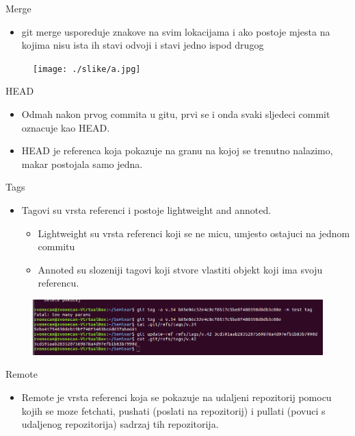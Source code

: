\documentclass[]{beamer}
\begin{document}
\begin{frame}{Merge}
\begin{itemize}
	\item git merge usporeduje znakove na svim lokacijama i ako postoje mjesta na kojima nisu ista ih stavi odvoji i stavi jedno ispod drugog
\end{itemize}
\begin{figure}
		\centering
	\texttt{[image: ./slike/a.jpg]}
	\end{figure}
\end{frame}

\begin{frame}{HEAD}
	\begin{itemize}
	\item Odmah nakon prvog commita u gitu, prvi se i onda svaki sljedeci commit oznacuje kao HEAD.
	\item HEAD je referenca koja pokazuje na granu na kojoj se trenutno nalazimo, makar postojala samo jedna.
	\end{itemize}
\end{frame}
\begin{frame}{Tags}
	\begin{itemize}
	\item Tagovi su vrsta referenci i postoje lightweight and annoted.
	\begin{itemize}
	\item Lightweight su vrsta referenci koji se ne micu, umjesto ostajuci na jednom commitu
	\item Annoted su slozeniji tagovi koji stvore vlastiti objekt koji ima svoju referencu.
	\end{itemize}
	\end{itemize}
\end{frame}
\begin{frame}
	\begin{figure}
	\includegraphics[width=1\textwidth]{./slike/tag.png}
	\end{figure}
\end{frame}
\begin{frame}{Remote}
	\begin{itemize}
	\item Remote je vrsta referenci koja se pokazuje na udaljeni repozitorij pomocu kojih se moze fetchati, pushati (poslati na repozitorij) i pullati (povuci s udaljenog repozitorija) sadrzaj tih repozitorija.  
	\end{itemize}
\end{frame}
\end{document}
